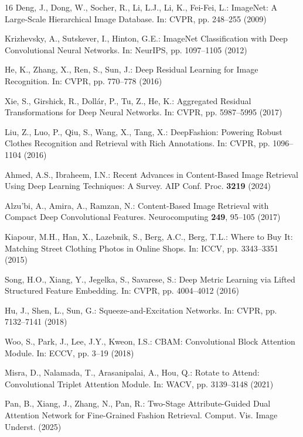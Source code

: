 \documentclass[runningheads]{llncs}
\begin{document}

\begin{thebibliography}{16}
Deng, J., Dong, W., Socher, R., Li, L.J., Li, K., Fei-Fei, L.: ImageNet: A Large-Scale Hierarchical Image Database. In: CVPR, pp. 248--255 (2009)

Krizhevsky, A., Sutskever, I., Hinton, G.E.: ImageNet Classification with Deep Convolutional Neural Networks. In: NeurIPS, pp. 1097--1105 (2012)

He, K., Zhang, X., Ren, S., Sun, J.: Deep Residual Learning for Image Recognition. In: CVPR, pp. 770--778 (2016)

Xie, S., Girshick, R., Doll{\'a}r, P., Tu, Z., He, K.: Aggregated Residual Transformations for Deep Neural Networks. In: CVPR, pp. 5987--5995 (2017)

Liu, Z., Luo, P., Qiu, S., Wang, X., Tang, X.: DeepFashion: Powering Robust Clothes Recognition and Retrieval with Rich Annotations. In: CVPR, pp. 1096--1104 (2016)

Ahmed, A.S., Ibraheem, I.N.: Recent Advances in Content-Based Image Retrieval Using Deep Learning Techniques: A Survey. AIP Conf. Proc. \textbf{3219} (2024)

Alzu'bi, A., Amira, A., Ramzan, N.: Content-Based Image Retrieval with Compact Deep Convolutional Features. Neurocomputing \textbf{249}, 95--105 (2017)

Kiapour, M.H., Han, X., Lazebnik, S., Berg, A.C., Berg, T.L.: Where to Buy It: Matching Street Clothing Photos in Online Shops. In: ICCV, pp. 3343--3351 (2015)

Song, H.O., Xiang, Y., Jegelka, S., Savarese, S.: Deep Metric Learning via Lifted Structured Feature Embedding. In: CVPR, pp. 4004--4012 (2016)

Hu, J., Shen, L., Sun, G.: Squeeze-and-Excitation Networks. In: CVPR, pp. 7132--7141 (2018)

Woo, S., Park, J., Lee, J.Y., Kweon, I.S.: CBAM: Convolutional Block Attention Module. In: ECCV, pp. 3--19 (2018)

Misra, D., Nalamada, T., Arasanipalai, A., Hou, Q.: Rotate to Attend: Convolutional Triplet Attention Module. In: WACV, pp. 3139--3148 (2021)

Pan, B., Xiang, J., Zhang, N., Pan, R.: Two-Stage Attribute-Guided Dual Attention Network for Fine-Grained Fashion Retrieval. Comput. Vis. Image Underst. (2025)


\end{thebibliography}
\end{document}
